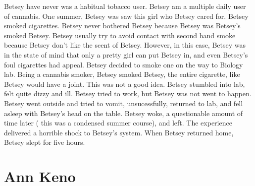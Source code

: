 \documentclass[12pt]{book}
\begin{document}
Betsey have never was a habitual tobacco user. Betsey am a multiple daily user of cannabis. One summer, Betsey was saw this girl who Betsey cared for. Betsey smoked cigarettes. Betsey never bothered Betsey because Betsey was Betsey's smoked Betsey. Betsey usually try to avoid contact with second hand smoke because Betsey don't like the scent of Betsey. However, in this case, Betsey was in the state of mind that only a pretty girl can put Betsey in, and even Betsey's foul cigarettes had appeal. Betsey decided to smoke one on the way to Biology lab. Being a cannabis smoker, Betsey smoked Betsey, the entire cigarette, like Betsey would have a joint. This was not a good idea. Betsey stumbled into lab, felt quite dizzy and ill. Betsey tried to work, but Betsey was not went to happen. Betsey went outside and tried to vomit, unsucessfully, returned to lab, and fell asleep with Betsey's head on the table. Betsey woke, a questionable amount of time later ( this was a condensed summer course), and left. The experience delivered a horrible shock to Betsey's system. When Betsey returned home, Betsey slept for five hours.



\chapter{Ann Keno}
\end{document}
